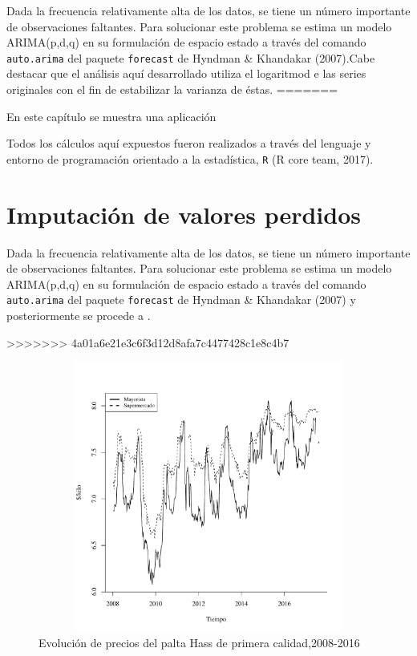 \documentclass[12pt, twoside]{book}\usepackage[]{graphicx}\usepackage[]{color}
\newenvironment{knitrout}{}{} %
\numberwithin{equation}{section}
\numberwithin{theorem}{section}
\numberwithin{teorema}{section}
\numberwithin{defi}{section}
\numberwithin{prop}{section}
\numberwithin{defi}{section}
\theoremstyle{plain}
\begin{document}
Dada la frecuencia relativamente alta de los datos, se tiene un número importante de observaciones faltantes. Para solucionar este problema se estima un modelo ARIMA(p,d,q) en su formulación de espacio estado a través del comando \texttt{auto.arima} del paquete \texttt{forecast} de Hyndman \& Khandakar (2007).Cabe destacar que el análisis aquí desarrollado utiliza el logaritmod e las series originales con el fin de estabilizar la varianza de éstas.
=======

En este capítulo se muestra una aplicación

Todos los cálculos aquí expuestos fueron realizados a través del lenguaje y entorno de programación orientado a la estadística, \texttt{R} (R core team, 2017).

\section{Imputación de valores perdidos}


Dada la frecuencia relativamente alta de los datos, se tiene un número importante de observaciones faltantes. Para solucionar este problema se estima un modelo ARIMA(p,d,q) en su formulación de espacio estado a través del comando \texttt{auto.arima} del paquete \texttt{forecast} de Hyndman \& Khandakar (2007) y posteriormente se procede a .

>>>>>>> 4a01a6e21e3c6f3d12d8afa7c4477428c1e8c4b7


\begin{knitrout}
\color{fgcolor}\begin{figure}[H]

{\centering \includegraphics[width=6.5in,height=3.5in]{figure/fig-2-1} 

}

\caption[Evolución de precios del palta Hass de primera calidad,2008-2016]{Evolución de precios del palta Hass de primera calidad,2008-2016}\label{fig:fig-2}
\end{figure}


\end{knitrout}
\end{document}
